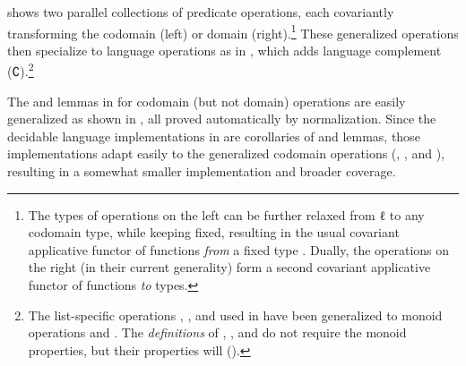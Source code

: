 \documentclass[acmsmall,screen,timestamp]{acmart}  %
\begin{document}
 shows two parallel collections of predicate operations, each covariantly transforming the codomain (left) or domain (right).\footnote{The types of operations on the left can be further relaxed from { \AB ℓ} to any codomain type, while keeping  fixed, resulting in the usual covariant applicative functor of functions \emph{from} a fixed type \citep{McBride2008APE}.
Dually, the operations on the right (in their current generality) form a second covariant applicative functor of functions \emph{to} types.}
These generalized operations then specialize to language operations as in , which adds language complement (\AF ∁).\footnote{The list-specific operations , \AIC{[]}, and  used in  have been generalized to monoid operations { and }.
The \emph{definitions} of , , and  do not require the monoid properties, but their properties will ().
}

\rnc{}
The  and  lemmas in  for codomain (but not domain) operations are easily generalized as shown in , all proved automatically by normalization.
Since the decidable language implementations in  are corollaries of  and  lemmas, those implementations adapt easily to the generalized codomain operations (, , and ), resulting in a somewhat smaller implementation and broader coverage.
\end{document}
